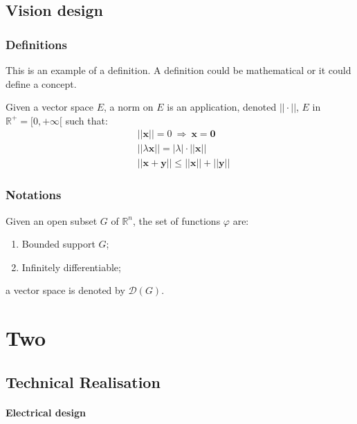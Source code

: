 \documentclass[11pt,fleqn]{book} %
\begin{document}
\chapter{Vision design}

\section{Definitions}

This is an example of a definition. A definition could be mathematical or it could define a concept.

\begin{definition}
Given a vector space $E$, a norm on $E$ is an application, denoted $||\cdot||$, $E$ in $\mathbb{R}^+=[0,+\infty[$ such that:
\begin{align}
& ||\mathbf{x}||=0\ \Rightarrow\ \mathbf{x}=\mathbf{0}\\
& ||\lambda \mathbf{x}||=|\lambda|\cdot ||\mathbf{x}||\\
& ||\mathbf{x}+\mathbf{y}||\leq ||\mathbf{x}||+||\mathbf{y}||
\end{align}
\end{definition}


\section{Notations}

\begin{notation}
Given an open subset $G$ of $\mathbb{R}^n$, the set of functions $\varphi$ are:
\begin{enumerate}
\item Bounded support $G$;
\item Infinitely differentiable;
\end{enumerate}
a vector space is denoted by $\mathcal{D}(G)$. 
\end{notation}

\part{Two}
\chapter{Technical Realisation}

\subsection{Electrical design}
\end{document}
